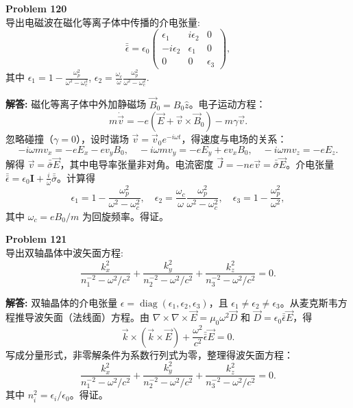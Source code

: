 \documentclass[12pt, a4paper, oneside]{ctexart}
\newenvironment{solution}{\par\noindent\textbf{解答:}\quad}{\par}
\begin{document}
\begin{mdframed}[backgroundcolor=gray!10, linewidth=0pt]
    \textbf{Problem 120} \\
    导出电磁波在磁化等离子体中传播的介电张量:
    \[
    \bar{\bar{\epsilon}} = \epsilon_0 \begin{pmatrix}
        \epsilon_1 & i\epsilon_2 & 0 \\
        -i\epsilon_2 & \epsilon_1 & 0 \\
        0 & 0 & \epsilon_3
    \end{pmatrix},
    \]
    其中 $\epsilon_1 = 1 - \frac{\omega_p^2}{\omega^2 - \omega_c^2}$, $\epsilon_2 = \frac{\omega_c}{\omega} \frac{\omega_p^2}{\omega^2 - \omega_c^2}$.
\end{mdframed}
\begin{solution}
    磁化等离子体中外加静磁场 $\vec{B}_0 = B_0 \hat{z}$。电子运动方程：
    \[
    m \dot{\vec{v}} = -e (\vec{E} + \vec{v} \times \vec{B}_0) - m \gamma \vec{v}.
    \]
    忽略碰撞（$\gamma=0$），设时谐场 $\vec{v} = \vec{v}_0 e^{-i\omega t}$，得速度与电场的关系：
    \[
    -i\omega m v_x = -e E_x - e v_y B_0, \quad -i\omega m v_y = -e E_y + e v_x B_0, \quad -i\omega m v_z = -e E_z.
    \]
    解得 $\vec{v} = \bar{\bar{\sigma}} \vec{E}$，其中电导率张量非对角。电流密度 $\vec{J} = -n e \vec{v} = \bar{\bar{\sigma}} \vec{E}$。介电张量 $\bar{\bar{\epsilon}} = \epsilon_0 \mathbf{I} + \frac{i}{\omega} \bar{\bar{\sigma}}$。计算得
    \[
    \epsilon_1 = 1 - \frac{\omega_p^2}{\omega^2 - \omega_c^2}, \quad \epsilon_2 = \frac{\omega_c}{\omega} \frac{\omega_p^2}{\omega^2 - \omega_c^2}, \quad \epsilon_3 = 1 - \frac{\omega_p^2}{\omega^2},
    \]
    其中 $\omega_c = eB_0/m$ 为回旋频率。得证。
\end{solution}

\begin{mdframed}[backgroundcolor=gray!10, linewidth=0pt]
    \textbf{Problem 121} \\
    导出双轴晶体中波矢面方程:
    \[
    \frac{k_x^2}{n_1^{-2} - \omega^2/c^2} + \frac{k_y^2}{n_2^{-2} - \omega^2/c^2} + \frac{k_z^2}{n_3^{-2} - \omega^2/c^2} = 0.
    \]
\end{mdframed}
\begin{solution}
    双轴晶体的介电张量 $\epsilon = \operatorname{diag}(\epsilon_1, \epsilon_2, \epsilon_3)$，且 $\epsilon_1 \neq \epsilon_2 \neq \epsilon_3$。从麦克斯韦方程推导波矢面（法线面）方程。由 $\nabla \times \nabla \times \vec{E} = \mu_0 \omega^2 \vec{D}$ 和 $\vec{D} = \epsilon_0 \bar{\bar{\epsilon}} \vec{E}$，得
    \[
    \vec{k} \times (\vec{k} \times \vec{E}) + \frac{\omega^2}{c^2} \bar{\bar{\epsilon}} \vec{E} = 0.
    \]
    写成分量形式，非零解条件为系数行列式为零，整理得波矢面方程：
    \[
    \frac{k_x^2}{n_1^{-2} - \omega^2/c^2} + \frac{k_y^2}{n_2^{-2} - \omega^2/c^2} + \frac{k_z^2}{n_3^{-2} - \omega^2/c^2} = 0.
    \]
    其中 $n_i^2 = \epsilon_i / \epsilon_0$。得证。
\end{solution}
\end{document}
